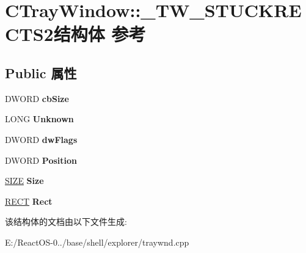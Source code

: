 \hypertarget{struct_c_tray_window_1_1___t_w___s_t_u_c_k_r_e_c_t_s2}{}\section{C\+Tray\+Window\+:\+:\+\_\+\+T\+W\+\_\+\+S\+T\+U\+C\+K\+R\+E\+C\+T\+S2结构体 参考}
\label{struct_c_tray_window_1_1___t_w___s_t_u_c_k_r_e_c_t_s2}
\subsection*{Public 属性}
\begin{DoxyCompactItemize}
\item 
\mbox{\label{struct_c_tray_window_1_1___t_w___s_t_u_c_k_r_e_c_t_s2_aaf76350c1436183cf5ac40a785362192}} 
D\+W\+O\+RD {\bfseries cb\+Size}
\item 
\mbox{\label{struct_c_tray_window_1_1___t_w___s_t_u_c_k_r_e_c_t_s2_afbbbc5bacacf9457b638799c86484127}} 
L\+O\+NG {\bfseries Unknown}
\item 
\mbox{\label{struct_c_tray_window_1_1___t_w___s_t_u_c_k_r_e_c_t_s2_add8da2c369b16db6f3634f1a5834913b}} 
D\+W\+O\+RD {\bfseries dw\+Flags}
\item 
\mbox{\label{struct_c_tray_window_1_1___t_w___s_t_u_c_k_r_e_c_t_s2_a9d012fb8a5e98b9e3e26606802cdcccf}} 
D\+W\+O\+RD {\bfseries Position}
\item 
\mbox{\label{struct_c_tray_window_1_1___t_w___s_t_u_c_k_r_e_c_t_s2_a37bce38e71d2fad659ef914ba4a95339}} 
\hyperlink{structtag_s_i_z_e}{S\+I\+ZE} {\bfseries Size}
\item 
\mbox{\label{struct_c_tray_window_1_1___t_w___s_t_u_c_k_r_e_c_t_s2_ada0ce4ff4b64e27f894136727c80bf9e}} 
\hyperlink{structtag_r_e_c_t}{R\+E\+CT} {\bfseries Rect}
\end{DoxyCompactItemize}


该结构体的文档由以下文件生成\+:\begin{DoxyCompactItemize}
\item 
E\+:/\+React\+O\+S-\/0../base/shell/explorer/traywnd.\+cpp\end{DoxyCompactItemize}
